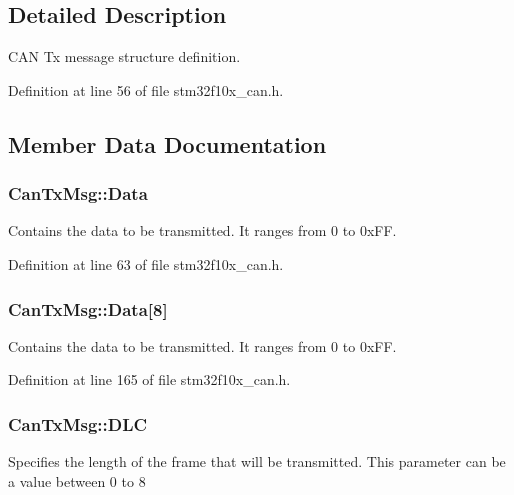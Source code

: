 \subsection{Detailed Description}
C\+AN Tx message structure definition. 

Definition at line 56 of file stm32f10x\+\_\+can.\+h.



\subsection{Member Data Documentation}
\subsubsection[{\texorpdfstring{Data}{Data}}]{ Can\+Tx\+Msg\+::\+Data}\hypertarget{struct_can_tx_msg_a177a3a7e7e5fe75540b9906732bda98c}{}\label{struct_can_tx_msg_a177a3a7e7e5fe75540b9906732bda98c}
Contains the data to be transmitted. It ranges from 0 to 0x\+FF. 

Definition at line 63 of file stm32f10x\+\_\+can.\+h.

\subsubsection[{\texorpdfstring{Data}{Data}}]{ Can\+Tx\+Msg\+::\+Data\mbox{[}8\mbox{]}}\hypertarget{struct_can_tx_msg_aabfbf718f627da26d9e3cf903dc0ad02}{}\label{struct_can_tx_msg_aabfbf718f627da26d9e3cf903dc0ad02}
Contains the data to be transmitted. It ranges from 0 to 0x\+FF. 

Definition at line 165 of file stm32f10x\+\_\+can.\+h.

\subsubsection[{\texorpdfstring{D\+LC}{DLC}}]{ Can\+Tx\+Msg\+::\+D\+LC}\hypertarget{struct_can_tx_msg_a3cf1c0e8d68447b817e007e7c9057441}{}\label{struct_can_tx_msg_a3cf1c0e8d68447b817e007e7c9057441}
Specifies the length of the frame that will be transmitted. This parameter can be a value between 0 to 8 

